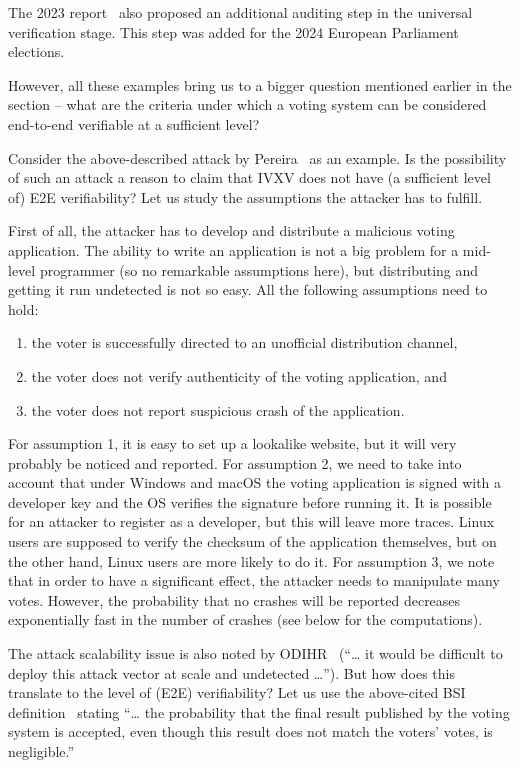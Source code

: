 \documentclass{llncs}
\begin{document}
The 2023 report~\cite{ODIHR2023} also proposed an additional auditing step in the universal verification stage. This step was added for the 2024 European Parliament elections. 

However, all these examples bring us to a bigger question mentioned earlier in the section -- what are the criteria under which a voting system can be considered end-to-end verifiable at a sufficient level?

Consider the above-described attack by Pereira~\cite{DBLP:conf/fc/Pereira22} as an example. Is the possibility of such an attack a reason to claim that IVXV does not have (a sufficient level of) E2E verifiability? Let us study the assumptions the attacker has to fulfill. 

First of all, the attacker has to develop and distribute a malicious voting application. The ability to write an application is not a big problem for a mid-level programmer (so no remarkable assumptions here), but distributing and getting it run undetected is not so easy. All the following assumptions need to hold:
\begin{enumerate}
    \item the voter is successfully directed to an unofficial distribution channel,
    \item the voter does not verify authenticity of the voting application, and
    \item the voter does not report suspicious crash of the application.
\end{enumerate}

For assumption 1, it is easy to set up a lookalike website, but it will very probably be noticed and reported. For assumption 2, we need to take into account that under Windows and macOS the voting application is signed with a developer key and the OS verifies the signature before running it. It is possible for an attacker to register as a developer, but this will leave more traces. Linux users are supposed to verify the checksum of the application themselves, but on the other hand, Linux users are more likely to do it. For assumption 3, we note that in order to have a significant effect, the attacker needs to manipulate many votes. However, the probability that no crashes will be reported decreases exponentially fast in the number of crashes (see below for the computations). 

The attack scalability issue is also noted by ODIHR~\cite{ODIHR2023} (``\dots{} it would be difficult to deploy this attack vector at scale and undetected \dots''). But how does this translate to the level of (E2E) verifiability? Let us use the above-cited BSI definition~\cite{BSIE2E} stating ``\dots{}  the probability that the final result published by the voting
system is accepted, even though this result does not match the voters' votes, is negligible.''
\end{document}

